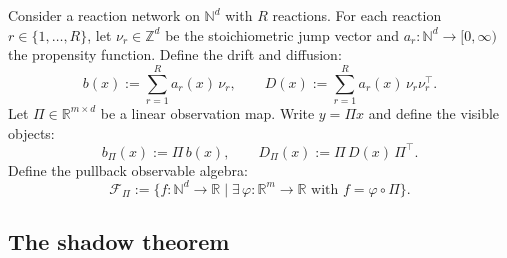 \documentclass[11pt,a4paper]{article}
\numberwithin{equation}{section}
\newcommand{\R}{\mathbb{R}}
\newcommand{\N}{\mathbb{N}}
\newcommand{\Z}{\mathbb{Z}}
\theoremstyle{thmcompact}
\theoremstyle{remark}
\begin{document}
Consider a reaction network on $\N^d$ with $R$ reactions. For each reaction $r \in \{1, \ldots, R\}$, let $\nu_r \in \Z^d$ be the stoichiometric jump vector and $a_r: \N^d \to [0, \infty)$ the propensity function. Define the drift and diffusion:
\begin{equation}\label{eq:B-drift-diff}
b(x) := \sum_{r=1}^R a_r(x)\,\nu_r, \qquad D(x) := \sum_{r=1}^R a_r(x)\,\nu_r\nu_r^\top.
\end{equation}
Let $\Pi \in \R^{m \times d}$ be a linear observation map. Write $y = \Pi x$ and define the visible objects:
\begin{equation}\label{eq:B-visible}
b_\Pi(x) := \Pi\, b(x), \qquad D_\Pi(x) := \Pi\, D(x)\, \Pi^\top.
\end{equation}
Define the pullback observable algebra:
\begin{equation}\label{eq:B-pullback}
\mathcal{F}_\Pi := \{f: \N^d \to \R \mid \exists\, \varphi: \R^m \to \R \text{ with } f = \varphi \circ \Pi\}.
\end{equation}

\subsection{The shadow theorem}
\end{document}

